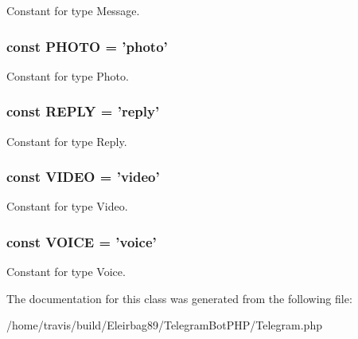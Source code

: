 Constant for type Message. \hypertarget{class_telegram_a0aeb08e94e66f9d958f565530b6b6a80}{
\subsubsection[{P\-H\-O\-T\-O}]{\setlength{\rightskip}{0pt plus 5cm}const P\-H\-O\-T\-O = 'photo'}}\label{class_telegram_a0aeb08e94e66f9d958f565530b6b6a80}
Constant for type Photo. \hypertarget{class_telegram_acb63774895b195d4c22afe2b089a3ddd}{
\subsubsection[{R\-E\-P\-L\-Y}]{\setlength{\rightskip}{0pt plus 5cm}const R\-E\-P\-L\-Y = 'reply'}}\label{class_telegram_acb63774895b195d4c22afe2b089a3ddd}
Constant for type Reply. \hypertarget{class_telegram_a333a9b0a1034beea1b4b505f30885cea}{
\subsubsection[{V\-I\-D\-E\-O}]{\setlength{\rightskip}{0pt plus 5cm}const V\-I\-D\-E\-O = 'video'}}\label{class_telegram_a333a9b0a1034beea1b4b505f30885cea}
Constant for type Video. \hypertarget{class_telegram_a12e48e3d10ee66d0a6ca34c207d8e282}{
\subsubsection[{V\-O\-I\-C\-E}]{\setlength{\rightskip}{0pt plus 5cm}const V\-O\-I\-C\-E = 'voice'}}\label{class_telegram_a12e48e3d10ee66d0a6ca34c207d8e282}
Constant for type Voice. 

The documentation for this class was generated from the following file\-:\begin{DoxyCompactItemize}
\item 
/home/travis/build/\-Eleirbag89/\-Telegram\-Bot\-P\-H\-P/Telegram.\-php\end{DoxyCompactItemize}
